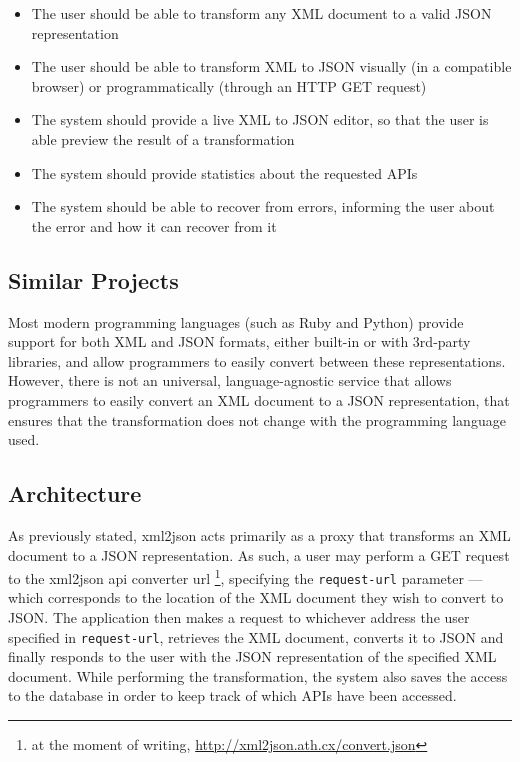 \documentclass[twocolumn,twoside,10pt,a4paper]{article}
\begin{document}
\begin{itemize}
    \item The user should be able to transform any XML document to a valid JSON representation
    \item The user should be able to transform XML to JSON visually (in a compatible browser) or programmatically (through an HTTP GET request)
    \item The system should provide a live XML to JSON editor, so that the user is able preview the result of a transformation
    \item The system should provide statistics about the requested APIs
    \item The system should be able to recover from errors, informing the user about the error and how it can recover from it
\end{itemize}

\subsection{Similar Projects}\label{sec:similar-projects}

Most modern programming languages (such as Ruby and Python) provide support for both XML and JSON formats, either built-in or with 3rd-party libraries, and allow programmers to easily convert between these representations. However, there is not an universal, language-agnostic service that allows programmers to easily convert an XML document to a JSON representation, that ensures that the transformation does not change with the programming language used.

\subsection{Architecture}\label{sec:architecture}

As previously stated, xml2json acts primarily as a proxy that transforms an XML document to a JSON representation. As such, a user may perform a GET request to the xml2json api converter url \footnote{at the moment of writing, \url{http://xml2json.ath.cx/convert.json}}, specifying the \verb!request-url! parameter --- which corresponds to the location of the XML document they wish to convert to JSON. The application then makes a request to whichever address the user specified in \verb!request-url!, retrieves the XML document, converts it to JSON and finally responds to the user with the JSON representation of the specified XML document. While performing the transformation, the system also saves the access to the database in order to keep track of which APIs have been accessed.
\end{document}
